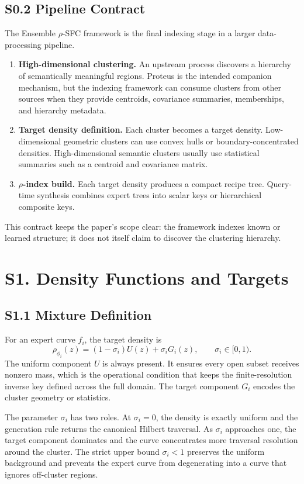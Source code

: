 \documentclass[11pt]{article}
\begin{document}
\subsection*{S0.2 Pipeline Contract}
The Ensemble $\rho$-SFC framework is the final indexing stage in a larger data-processing pipeline.
\begin{enumerate}[leftmargin=1.5em]
    \item \textbf{High-dimensional clustering.} An upstream process discovers a hierarchy of semantically meaningful regions. Proteus is the intended companion mechanism, but the indexing framework can consume clusters from other sources when they provide centroids, covariance summaries, memberships, and hierarchy metadata.
    \item \textbf{Target density definition.} Each cluster becomes a target density. Low-dimensional geometric clusters can use convex hulls or boundary-concentrated densities. High-dimensional semantic clusters usually use statistical summaries such as a centroid and covariance matrix.
    \item \textbf{$\rho$-index build.} Each target density produces a compact recipe tree. Query-time synthesis combines expert trees into scalar keys or hierarchical composite keys.
\end{enumerate}
This contract keeps the paper's scope clear: the framework indexes known or learned structure; it does not itself claim to discover the clustering hierarchy.

\section*{S1. Density Functions and Targets}
\label{sec:si-density}

\subsection*{S1.1 Mixture Definition}
For an expert curve $f_i$, the target density is
\[
\rho_{\phi_i}(z)=(1-\sigma_i)U(z)+\sigma_iG_i(z),
\qquad \sigma_i\in[0,1).
\]
The uniform component $U$ is always present. It ensures every open subset receives nonzero mass, which is the operational condition that keeps the finite-resolution inverse key defined across the full domain. The target component $G_i$ encodes the cluster geometry or statistics.

The parameter $\sigma_i$ has two roles. At $\sigma_i=0$, the density is exactly uniform and the generation rule returns the canonical Hilbert traversal. As $\sigma_i$ approaches one, the target component dominates and the curve concentrates more traversal resolution around the cluster. The strict upper bound $\sigma_i<1$ preserves the uniform background and prevents the expert curve from degenerating into a curve that ignores off-cluster regions.
\end{document}
